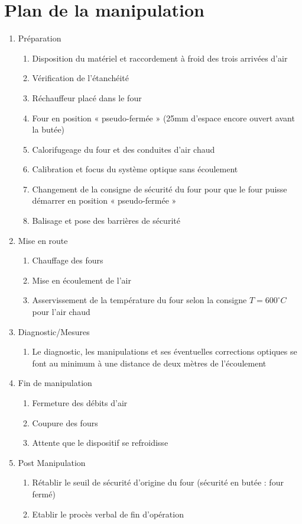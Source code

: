 \section{Plan de la manipulation}
\begin{enumerate}
\item Préparation
\begin{enumerate}
\item Disposition du matériel et raccordement à froid des trois arrivées d’air
\item Vérification de l'étanchéité
\item Réchauffeur placé dans le four
\item Four en position « pseudo-fermée » (25mm d’espace encore ouvert avant la butée)
\item Calorifugeage du four et des conduites d’air chaud
\item Calibration et focus du système optique sans écoulement
\item Changement de la consigne de sécurité du four pour que le four puisse démarrer en position « pseudo-fermée »
\item Balisage et pose des barrières de sécurité
\end{enumerate}
\item Mise en route
\begin{enumerate}
\item Chauffage des fours
\item Mise en écoulement de l’air
\item Asservissement de la température du four selon la consigne $T=600 ^\circ C$  pour l’air chaud
\end{enumerate}
\item Diagnostic/Mesures
\begin{enumerate}
\item Le diagnostic, les manipulations et ses éventuelles corrections optiques se font au minimum à une distance de deux mètres de l’écoulement
 \end{enumerate}
\item Fin de manipulation
\begin{enumerate}
\item Fermeture des débits d’air
\item Coupure des fours
\item Attente que le dispositif se refroidisse
 \end{enumerate}
\item Post Manipulation
\begin{enumerate}
\item Rétablir le seuil de sécurité d’origine du four (sécurité en butée : four fermé)
\item Etablir le procès verbal de fin d’opération
 \end{enumerate}
 \end{enumerate}
